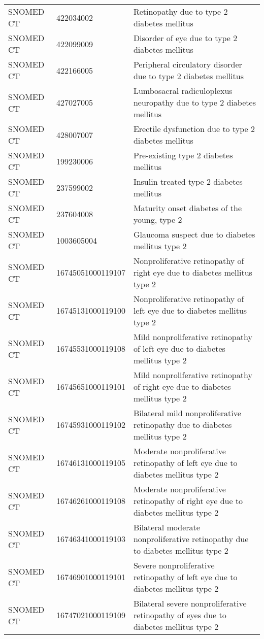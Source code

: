 \begin{longtable}{p{}p{}p{}}
  SNOMED CT & 422034002 & Retinopathy due to type 2 diabetes mellitus \\ 
  SNOMED CT & 422099009 & Disorder of eye due to type 2 diabetes mellitus \\ 
  SNOMED CT & 422166005 & Peripheral circulatory disorder due to type 2 diabetes mellitus \\ 
  SNOMED CT & 427027005 & Lumbosacral radiculoplexus neuropathy due to type 2 diabetes mellitus \\ 
  SNOMED CT & 428007007 & Erectile dysfunction due to type 2 diabetes mellitus \\ 
  SNOMED CT & 199230006 & Pre-existing type 2 diabetes mellitus \\ 
  SNOMED CT & 237599002 & Insulin treated type 2 diabetes mellitus \\ 
  SNOMED CT & 237604008 & Maturity onset diabetes of the young, type 2 \\ 
  SNOMED CT & 1003605004 & Glaucoma suspect due to diabetes mellitus type 2 \\ 
  SNOMED CT & 16745051000119107 & Nonproliferative retinopathy of right eye due to diabetes mellitus type 2 \\ 
  SNOMED CT & 16745131000119100 & Nonproliferative retinopathy of left eye due to diabetes mellitus type 2 \\ 
  SNOMED CT & 16745531000119108 & Mild nonproliferative retinopathy of left eye due to diabetes mellitus type 2 \\ 
  SNOMED CT & 16745651000119101 & Mild nonproliferative retinopathy of right eye due to diabetes mellitus type 2 \\ 
  SNOMED CT & 16745931000119102 & Bilateral mild nonproliferative retinopathy due to diabetes mellitus type 2 \\ 
  SNOMED CT & 16746131000119105 & Moderate nonproliferative retinopathy of left eye due to diabetes mellitus type 2 \\ 
  SNOMED CT & 16746261000119108 & Moderate nonproliferative retinopathy of right eye due to diabetes mellitus type 2 \\ 
  SNOMED CT & 16746341000119103 & Bilateral moderate nonproliferative retinopathy due to diabetes mellitus type 2 \\ 
  SNOMED CT & 16746901000119101 & Severe nonproliferative retinopathy of left eye due to diabetes mellitus type 2 \\ 
  SNOMED CT & 16747021000119109 & Bilateral severe nonproliferative retinopathy of eyes due to diabetes mellitus type 2 \\ 

\end{longtable}
